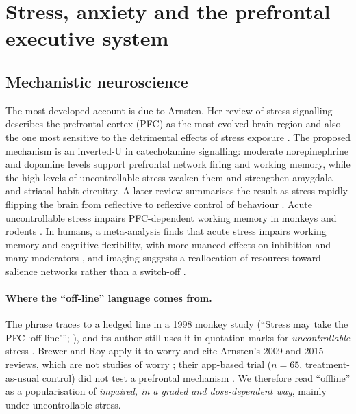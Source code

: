 \section{Stress, anxiety and the prefrontal executive system}\label{sec:stress}
\subsection{Mechanistic neuroscience}
The most developed account is due to Arnsten. Her review of stress signalling describes the prefrontal cortex (PFC) as the most evolved brain region and also the one most sensitive to the detrimental effects of stress exposure \citep{arnsten2009stress}. The proposed mechanism is an inverted-U in catecholamine signalling: moderate norepinephrine and dopamine levels support prefrontal network firing and working memory, while the high levels of uncontrollable stress weaken them and strengthen amygdala and striatal habit circuitry. A later review summarises the result as stress rapidly flipping the brain from reflective to reflexive control of behaviour \citep{arnsten2015stress}. Acute uncontrollable stress impairs PFC-dependent working memory in monkeys and rodents \citep{arnsten1998noise}. In humans, a meta-analysis finds that acute stress impairs working memory and cognitive flexibility, with more nuanced effects on inhibition and many moderators \citep{shields2016stress}, and imaging suggests a reallocation of resources toward salience networks rather than a switch-off \citep{hermans2014networks}.

\paragraph{Where the ``off-line'' language comes from.} The phrase traces to a hedged line in a 1998 monkey study (``Stress may take the PFC `off-line'''; \citealt{arnsten1998noise}), and its author still uses it in quotation marks for \emph{uncontrollable} stress \citep{arnsten2020guanfacine}. Brewer and Roy apply it to worry and cite Arnsten's 2009 and 2015 reviews, which are not studies of worry \citep{brewer2021habit}; their app-based trial ($n=65$, treatment-as-usual control) did not test a prefrontal mechanism \citep{roy2021app}. We therefore read ``offline'' as a popularisation of \emph{impaired, in a graded and dose-dependent way}, mainly under uncontrollable stress.

